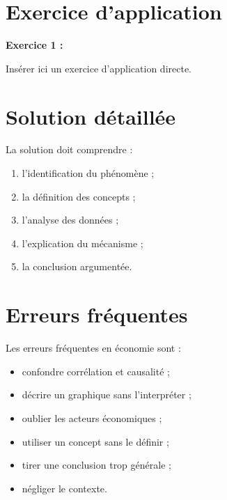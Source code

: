 \documentclass[11pt,a4paper]{article}
\begin{document}
\section{Exercice d’application}

\begin{cadreenonce}
\textbf{Exercice 1 :}

Insérer ici un exercice d’application directe.
\end{cadreenonce}

\section{Solution détaillée}

\begin{cadresolution}
La solution doit comprendre :
\begin{enumerate}
    \item l’identification du phénomène ;
    \item la définition des concepts ;
    \item l’analyse des données ;
    \item l’explication du mécanisme ;
    \item la conclusion argumentée.
\end{enumerate}
\end{cadresolution}

\section{Erreurs fréquentes}

\begin{cadreattention}
Les erreurs fréquentes en économie sont :
\begin{itemize}
    \item confondre corrélation et causalité ;
    \item décrire un graphique sans l’interpréter ;
    \item oublier les acteurs économiques ;
    \item utiliser un concept sans le définir ;
    \item tirer une conclusion trop générale ;
    \item négliger le contexte.
\end{itemize}
\end{cadreattention}
\end{document}
